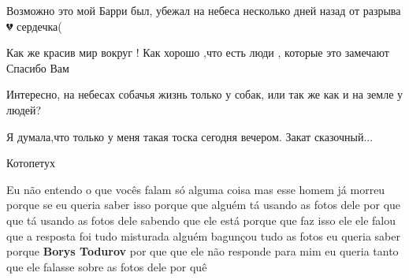 \begin{itemize}
Возможно это мой Барри был, убежал на небеса несколько дней назад от разрыва 💔 сердечка(

Как же красив мир вокруг ! Как хорошо ,что есть люди , которые это замечают Спасибо Вам

Интересно, на небесах собачья жизнь только у собак, или так же как и на земле у людей?

Я думала,что только у меня такая тоска сегодня вечером. Закат сказочный...


Котопетух


Eu não entendo o que vocês falam só alguma coisa mas esse homem já morreu
porque se eu queria saber isso porque que alguém tá usando as fotos dele por
que que tá usando as fotos dele sabendo que ele está porque que faz isso ele
ele falou que a resposta foi tudo misturada alguém bagunçou tudo as fotos eu
queria saber porque \textbf{Borys Todurov} por que que ele não responde para mim eu
queria tanto que ele falasse sobre as fotos dele por quê

\end{itemize}

